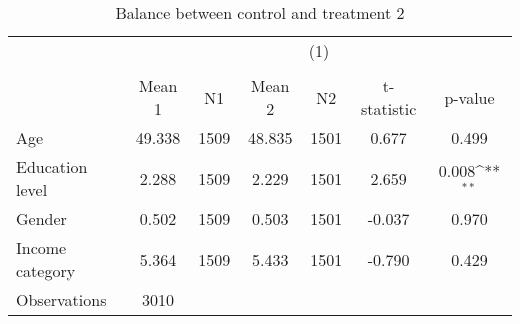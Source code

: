 \begin{table}[htbp]\centering
\def\sym#1{\ifmmode^{#1}\else\(^{#1}\)\fi}
\caption{Balance between control and treatment 2}
\begin{tabular}{l*{1}{cccccc}}
\hline\hline
                    &\multicolumn{6}{c}{(1)}                                                               \\
                    &\multicolumn{6}{c}{}                                                                  \\
                    &      Mean 1&          N1&      Mean 2&          N2& t-statistic&     p-value         \\
\hline
Age                 &      49.338&        1509&      48.835&        1501&       0.677&       0.499         \\
Education level     &       2.288&        1509&       2.229&        1501&       2.659&       0.008\sym{**} \\
Gender              &       0.502&        1509&       0.503&        1501&      -0.037&       0.970         \\
Income category     &       5.364&        1509&       5.433&        1501&      -0.790&       0.429         \\
\hline
Observations        &        3010&            &            &            &            &                     \\
\hline\hline
\end{tabular}
\end{table}
